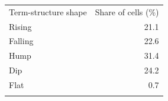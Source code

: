 \begin{tabular}{@{}lr@{}}
\toprule
Term-structure shape & Share of cells (\%) \\
\colrule
Rising & 21.1 \\
Falling & 22.6 \\
Hump & 31.4 \\
Dip & 24.2 \\
Flat & 0.7 \\
\botrule
\end{tabular}